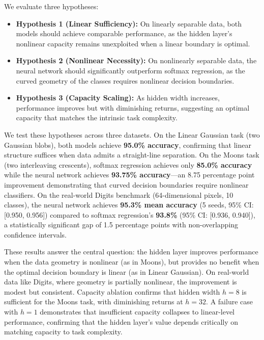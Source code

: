 \documentclass[11pt]{article}
\begin{document}
We evaluate three hypotheses:

\begin{itemize}
    \item \textbf{Hypothesis 1 (Linear Sufficiency):} On linearly separable data, both models should achieve comparable performance, as the hidden layer's nonlinear capacity remains unexploited when a linear boundary is optimal.
    \item \textbf{Hypothesis 2 (Nonlinear Necessity):} On nonlinearly separable data, the neural network should significantly outperform softmax regression, as the curved geometry of the classes requires nonlinear decision boundaries.
    \item \textbf{Hypothesis 3 (Capacity Scaling):} As hidden width increases, performance improves but with diminishing returns, suggesting an optimal capacity that matches the intrinsic task complexity.
\end{itemize}

We test these hypotheses across three datasets. On the Linear Gaussian task (two Gaussian blobs), both models achieve \textbf{95.0\% accuracy}, confirming that linear structure suffices when data admits a straight-line separation. On the Moons task (two interleaving crescents), softmax regression achieves only \textbf{85.0\% accuracy} while the neural network achieves \textbf{93.75\% accuracy}---an 8.75 percentage point improvement demonstrating that curved decision boundaries require nonlinear classifiers. On the real-world Digits benchmark (64-dimensional pixels, 10 classes), the neural network achieves \textbf{95.3\% mean accuracy} (5 seeds, 95\% CI: [0.950, 0.956]) compared to softmax regression's \textbf{93.8\%} (95\% CI: [0.936, 0.940]), a statistically significant gap of 1.5 percentage points with non-overlapping confidence intervals.

These results answer the central question: the hidden layer improves performance when the data geometry is nonlinear (as in Moons), but provides no benefit when the optimal decision boundary is linear (as in Linear Gaussian). On real-world data like Digits, where geometry is partially nonlinear, the improvement is modest but consistent. Capacity ablation confirms that hidden width $h = 8$ is sufficient for the Moons task, with diminishing returns at $h = 32$. A failure case with $h = 1$ demonstrates that insufficient capacity collapses to linear-level performance, confirming that the hidden layer's value depends critically on matching capacity to task complexity.
\end{document}
